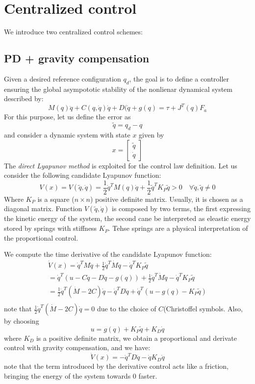 \documentclass{book}
\begin{document}
\section{Centralized control}
We introduce two centralized control schemes:
\subsection{PD + gravity compensation}
Given a desired reference configuration $q_d$, the goal is to define a controller ensuring the global asympototic stability of the nonlienar dynamical system described by:
\[
    M(q)\ddot{q}+C(q,\dot{q})\dot{q}+D(\dot{q}+g(q) = \tau + J^T(q)F_a
\]
For this purpose, let us define the error as
\[
    \tilde{q}=q_d-q
\]
and consider a dynamic system with state $x$ given by
\[
    x=\begin{bmatrix}
        \tilde{q}\\\dot{q}
    \end{bmatrix}
\]
The \emph{direct Lyapunov method} is exploited for the control law definition.
Let us consider the following candidate Lyapunov function:
\[
    V(x) = V(\tilde{q},\dot{q}) = \frac{1}{2}\dot{q}^TM(q)\dot{q}+\frac{1}{2}\tilde{q}^TK_P\tilde{q}>0 \quad \forall \dot{q},\tilde{q} \neq 0
\]
Where $K_P$ is a square ($n\times n$) positive definite matrix. Usually, it is chosen as a diagonal matrix. Function $V(\tilde{q},\dot{q})$ is composed by two terms, the first expressing the kinetic energy of the system, the second cane be interpreted as eleastic energy stored by springs with stiffness $K_P$. Tehse springs are a physical interpretation of the proportional control.

We compute the time derivative of the candidate Lyapunov function:
\begin{gather*}
    \dot{V}(x)=\dot{q}^TM\ddot{q}+\frac{1}{2}\dot{q}^T\dot{M}\dot{q}-\dot{q}^TK_P\tilde{q}\\
    =\dot{q}^T(u-C\dot{q}-D\dot{q}-g(q))+\frac{1}{2}\dot{q}^T\dot{M}\dot{q}-\dot{q}^TK_P\tilde{q}\\
    =\frac{1}{2}\dot{q}^T(\dot{M}-2C)\dot{q}-\dot{q}^TD\dot{q}+\dot{q}^T(u-g(q)-K_P\tilde{q})\\
\end{gather*}
note that $\frac{1}{2}\dot{q}^T(\dot{M}-2C)\dot{q}=0$ due to the choice of $C$(Christoffel symbols. Also, by choosing
\[
    u=g(q)+K_P\tilde{q}+K_D\dot{q}
\]
where $K_D$ is a positive definite matrix, we obtain a proportional and derivate control with gravity compensation, and we have:
\[
    \dot{V}(x)=-\dot{q}^TD\dot{q}-\dot{q}K_D\dot{q}
\]
note that the term introduced by the derivative control acts like a friction, bringing the energy of the system towards 0 faster.
\end{document}
